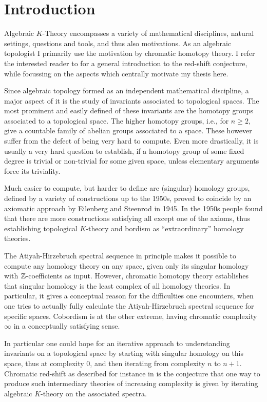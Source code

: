 \chapter*{Introduction}

Algebraic $K$-Theory encompasses a variety of mathematical disciplines, natural
settings, questions and tools, and thus also motivations. As an algebraic topologist
I primarily use the motivation by chromatic homotopy theory. I refer the interested
reader to \cite{Rog14} for a general introduction to the red-shift conjecture, while 
focussing on the aspects which centrally motivate my thesis here.

Since algebraic topology formed as an independent mathematical discipline, a major
aspect of it is the study of invariants associated to topological spaces. The most prominent
and easily defined of these invariants are the homotopy groups associated to a topological
space. The higher homotopy groups, i.e., for $n\geq2$, 
give a countable family of abelian groups associated to a space. These
however suffer from the defect of being very hard to compute. Even more drastically,
it is usually a very hard question to establish, if a homotopy group of some fixed degree
is trivial or non-trivial for some given space, unless elementary arguments
force its triviality.

Much easier to compute, but harder to define are (singular) homology groups, defined by 
a variety of constructions up to the 1950s, proved to coincide by an axiomatic approach by 
Eilenberg and Steenrod in 1945. In the 1950s people found that there are more
constructions satisfying all except one of the axioms, thus establishing topological
$K$-theory and bordism as ``extraordinary'' homology theories. 

The Atiyah-Hirzebruch spectral sequence in principle makes it possible to compute
any homology theory on any space, given only its singular homology with $\mathbb{Z}$-coefficients
as input. However, chromatic homotopy theory establishes
that singular homology is the least complex of all homology theories. In particular,
it gives a conceptual reason for the difficulties one encounters, when one tries to actually
fully calculate the Atiyah-Hirzebruch spectral sequence for specific spaces. Cobordism is
at the other extreme, having chromatic complexity $\infty$ in a conceptually satisfying sense. 

In particular one could hope for an iterative approach to understanding invariants on a 
topological space by starting with singular homology on this space, thus at complexity
$0$, and then iterating from complexity $n$ to $n+1$. Chromatic
red-shift as described for instance in \cite{Rog14} is the conjecture that one way to
produce such intermediary theories of increasing complexity is given by 
iterating algebraic $K$-theory on the associated spectra. 

